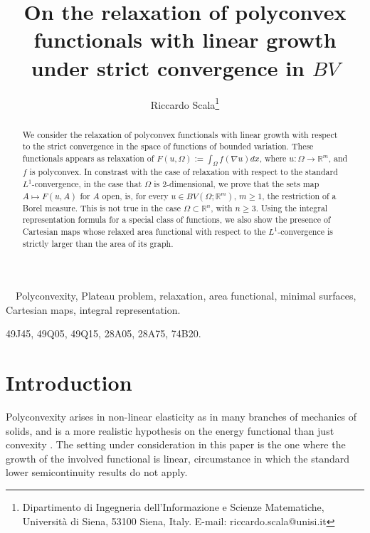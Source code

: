 \documentclass[a4paper,11pt]{article}
\title{On the relaxation of polyconvex functionals with linear growth under strict convergence in $BV$
}
\author{
	Riccardo Scala\footnote{ 
		Dipartimento di Ingegneria dell'Informazione e Scienze Matematiche, Universit\`a di Siena, 53100 Siena, Italy.
		E-mail: riccardo.scala@unisi.it}
}
\numberwithin{equation}{section}
\newcommand{\Om}{\Omega}
\newcommand{\R}{\mathbb{R}}
\begin{document}
\maketitle

\begin{abstract}
We consider the relaxation of polyconvex functionals with linear growth with respect to the strict convergence in the space of functions of bounded variation. These functionals appears as relaxation of  $F(u,\Omega):=\int_\Omega f(\nabla u)dx$, where $u:\Om\rightarrow \R^m$, and $f$ is polyconvex. In constrast with the case of relaxation with respect to the standard $L^1$-convergence, in the case that $\Omega$ is $2$-dimensional, we prove that the sets map $A\mapsto F(u,A)$ for $A$ open, is, for every $u\in BV(\Om;\R^m)$, $m\geq1$, the restriction of a Borel measure. This is not true in the case $\Omega\subset\R^n$, with $n\geq3$. Using the integral representation formula for a special class of functions, we also show the presence of Cartesian maps whose relaxed area functional with respect to the $L^1$-convergence is strictly larger than the area of its graph. 
\end{abstract}

~~Polyconvexity, Plateau problem, relaxation, area functional, minimal surfaces, Cartesian maps, integral representation. 


\vspace{2mm}

  49J45, 49Q05, 49Q15, 28A05, 28A75, 74B20.

\section{Introduction}
Polyconvexity arises in non-linear elasticity as in many branches of mechanics of solids, and is a more realistic hypothesis on the energy functional than just convexity \cite{Ball}.
The setting under consideration in this paper is the one where the growth of the involved functional is linear, circumstance in which the standard lower semicontinuity results  \cite{GMS3,FuHu:95} do not apply. 
\end{document}
